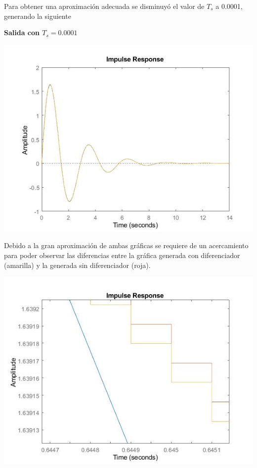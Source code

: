 Para obtener una aproximación adecuada se disminuyó el valor de $T_s$ a 0.0001, generando la siguiente 
\newline

\noindent \textbf{Salida con $T_s=0.0001$}

\noindent \includegraphics[scale=0.6]{./img2/SalidaTs00001DosHz}

Debido a la gran aproximación de ambas gráficas se requiere de un acercamiento para poder observar las diferencias entre la gráfica generada con diferenciador (amarilla) y la generada sin diferenciador (roja).

\noindent \includegraphics[scale=0.6]{./img2/SalidaTs00001DosHzAcercamiento}

